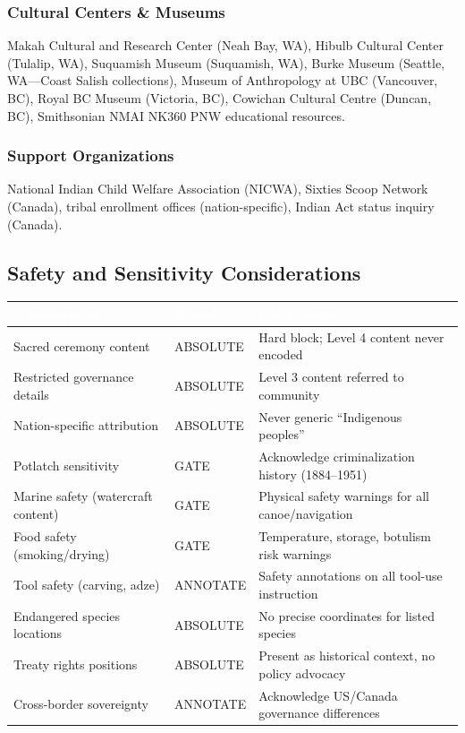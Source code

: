 \documentclass[11pt,letterpaper]{article}
\newcommand{\tableheader}[1]{\textbf{\sffamily\textcolor{white}{#1}}}
\begin{document}
\subsubsection{Cultural Centers \& Museums}

Makah Cultural and Research Center (Neah Bay, WA), Hibulb Cultural Center (Tulalip, WA), Suquamish Museum (Suquamish, WA), Burke Museum (Seattle, WA---Coast Salish collections), Museum of Anthropology at UBC (Vancouver, BC), Royal BC Museum (Victoria, BC), Cowichan Cultural Centre (Duncan, BC), Smithsonian NMAI NK360 PNW educational resources.

\subsubsection{Support Organizations}

National Indian Child Welfare Association (NICWA), Sixties Scoop Network (Canada), tribal enrollment offices (nation-specific), Indian Act status inquiry (Canada).

\subsection{Safety and Sensitivity Considerations}

\begin{center}
\begin{tabularx}{\textwidth}{L{3.5cm}C{1.8cm}X}
\toprule
{}
\tableheader{Consideration} & \tableheader{Boundary} & \tableheader{Enforcement} \\
\midrule
Sacred ceremony content & ABSOLUTE & Hard block; Level 4 content never encoded \\
Restricted governance details & ABSOLUTE & Level 3 content referred to community \\
Nation-specific attribution & ABSOLUTE & Never generic ``Indigenous peoples'' \\
Potlatch sensitivity & GATE & Acknowledge criminalization history (1884--1951) \\
Marine safety (watercraft content) & GATE & Physical safety warnings for all canoe/navigation \\
Food safety (smoking/drying) & GATE & Temperature, storage, botulism risk warnings \\
Tool safety (carving, adze) & ANNOTATE & Safety annotations on all tool-use instruction \\
Endangered species locations & ABSOLUTE & No precise coordinates for listed species \\
Treaty rights positions & ABSOLUTE & Present as historical context, no policy advocacy \\
Cross-border sovereignty & ANNOTATE & Acknowledge US/Canada governance differences \\
\bottomrule
\end{tabularx}
\end{center}
\end{document}
